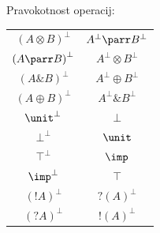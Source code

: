 Pravokotnost operacij:
%
\begin{table}[htb]
    \centering
    \begin{tabular}{c|c}
        \({(A \otimes B)}^{\bot}\)  & \(A^\bot \parr    B^\bot\)     \\ 
        \({(A \parr B)}^{\bot}\)    & \(A^\bot \otimes  B^\bot\)     \\
        \({(A \& B)}^{\bot}\)       & \(A^\bot \oplus   B^\bot\)     \\ 
        \({(A \oplus B)}^{\bot}\)   & \(A^\bot \&       B^\bot\)     \\
        \({\unit}^{\bot}\)          & \(\bot\)                       \\
        \({\bot}^{\bot}\)           & \(\unit\)                      \\
        \({\top}^{\bot}\)           & \(\imp\)                       \\
        \({\imp}^{\bot}\)           & \(\top\)                       \\
        \({(!A)}^{\bot}\)           & \(?{(A)}^\bot\)                \\
        \({(?A)}^{\bot}\)           & \(!{(A)}^\bot\)                \\
    \end{tabular}
\end{table}








